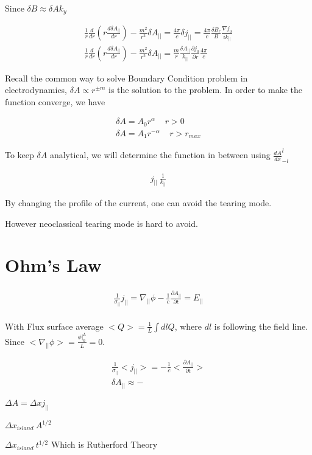 Since $\delta B\approx \delta Ak_y$

\begin{eqnarray}
    \frac{1}{r}\frac{d}{dr}(r\frac{d \delta A_{||}}{dr}) -\frac{m^2}{r^2} \delta A_{||}=\frac{4\pi}{c} \delta j_{||}= \frac{4\pi}{c}\frac{\delta B_r}{B}\frac{\nabla j_0}{ik_{||}}\\
    \frac{1}{r}\frac{d}{dr}(r\frac{d \delta A_{||}}{dr}) -\frac{m^2}{r^2} \delta A_{||}=\frac{m}{r}\frac{\delta A_{||}}{k_{||}}\frac{\partial j_0}{\partial r} \frac{4\pi}{c}
\end{eqnarray}

Recall the common way to solve Boundary Condition problem in electrodynamics, 
$\delta A \propto r^{\pm m} $ is the solution to the problem. In order to make the function converge, we have 

\begin{eqnarray}
    \delta A = A_0 r^\alpha \ \ \ \ \ r>0\\
    \delta A = A_1 r^{-\alpha} \ \ \ \ \ r>r_{max}
\end{eqnarray}

To keep $\delta A$ analytical, we will determine the function in between using $\frac{dA}{dx}^{l}_{-l}$


\begin{eqnarray}
    j_{||} ~ \frac{1}{k_{||}}
\end{eqnarray}

By changing the profile of the current, one can avoid the tearing mode. 

However neoclassical tearing mode is hard to avoid. 

\section{Ohm's Law}

\begin{equation}
    \begin{aligned}
    \frac{1}{\sigma_{||}} j_{||}=\nabla_{||} \phi -\frac{1}{c}\frac{\partial A_{||}}{\partial t}=E_{||}\\
    \end{aligned}
\end{equation}

With Flux surface average $<Q>=\frac{1}{L}\int dl Q$, where $dl$ is following the field line. Since $<\nabla_{||} \phi>=\frac{\phi|^L_0}{L}=0$.

\begin{equation}
    \begin{aligned}
     \frac{1}{\sigma_{||}}<j_{||}>=-\frac{1}{c}<\frac{\partial A_{||}}{\partial t}>\\
     \delta A_{||}\approx -
    \end{aligned}
\end{equation}

$\Delta A=\Delta x j_{||}$

$\Delta x_{island} ~ A^{1/2}$

$\Delta x_{island} ~ t^{1/2}$ Which is Rutherford Theory

